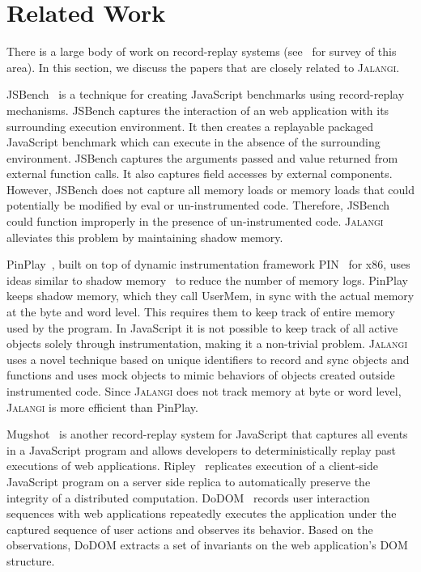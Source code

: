 \documentclass{sig-alternate}
\def\jalangi{\textsc{Jalangi}}
\begin{document}
\section{Related Work}
\label{sec:related-work}

There is a large body of work on record-replay systems
(see~\cite{Cornelis03ataxonomy,Dionne96ataxonomy} for survey of this
area).  In this section, we discuss the papers that are closely
related to \jalangi{}.

JSBench~\cite{Richards:2011:ACJ:2048066.2048119} is a technique for
creating JavaScript benchmarks using record-replay mechanisms.
JSBench captures the interaction of an web application with its
surrounding execution environment.  It then creates a replayable
packaged JavaScript benchmark which can execute in the absence of the
surrounding environment.  JSBench captures the arguments passed and
value returned from external function calls.  It also captures field
accesses by external components.  However, JSBench does not capture
all memory loads or memory loads that could potentially be modified by
eval or un-instrumented code.  Therefore, JSBench could function
improperly in the presence of un-instrumented code.  \jalangi{}
alleviates this problem by maintaining shadow memory. %

PinPlay~\cite{Patil:2010:PFD:1772954.1772958}, built on top of dynamic
instrumentation framework PIN~\cite{Luk:2005:PBC:1065010.1065034} for
x86, uses ideas similar to shadow
memory~\cite{Narayanasamy:2006:ALO:1140277.1140303} to reduce the
number of memory logs.  PinPlay keeps shadow memory, which they call
UserMem, in sync with the actual memory at the byte and word level.
This requires them to keep track of entire memory used by the program.
In JavaScript it is not possible to keep track of all active objects
solely through instrumentation, making it a non-trivial problem.  \jalangi{} uses a novel
technique based on unique identifiers to record and sync objects and
functions and uses mock objects to mimic behaviors of objects created
outside instrumented code.  Since \jalangi{} does not track memory at
byte or word level, \jalangi{} is more efficient than PinPlay.

Mugshot~\cite{Mickens:2010:MDC:1855711.1855722} is another
record-replay system for JavaScript that captures all events in a
JavaScript program and allows developers to deterministically replay
past executions of web applications.
Ripley~\cite{Vikram:2009:RAS:1653662.1653685} replicates execution of
a client-side JavaScript program on a server side replica to
automatically preserve the integrity of a distributed computation.
DoDOM~\cite{Pattabiraman:2010:DLD:1913797.1914375} records user
interaction sequences with web applications repeatedly executes the
application under the captured sequence of user actions and observes
its behavior. Based on the observations, DoDOM extracts a set of
invariants on the web application's DOM structure.
\end{document}
